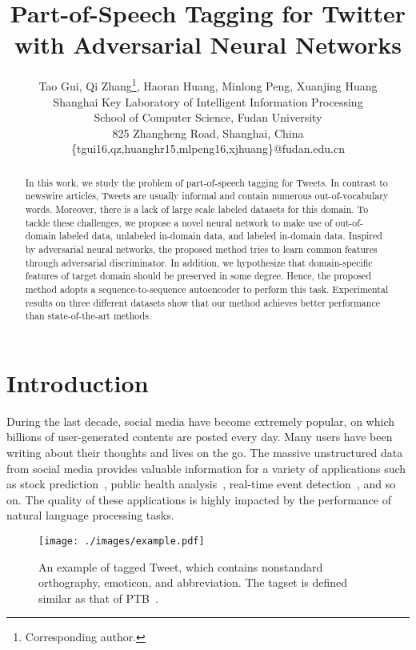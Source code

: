 \documentclass[11pt,letterpaper]{article}
\title{Part-of-Speech Tagging for Twitter with Adversarial Neural Networks}
\author{Tao Gui, Qi Zhang\thanks{{ }{ }Corresponding author.}, Haoran Huang, Minlong Peng, Xuanjing Huang\\
Shanghai Key Laboratory of Intelligent Information Processing\\
School of Computer Science, Fudan University\\
825 Zhangheng Road, Shanghai, China\\
\{tgui16,qz,huanghr15,mlpeng16,xjhuang\}@fudan.edu.cn}
\date{}
\begin{document}
\maketitle

\begin{abstract}
In this work, we study the problem of part-of-speech tagging for Tweets. In contrast to newswire articles, Tweets are usually informal and contain numerous out-of-vocabulary words. Moreover, there is a lack of large scale labeled datasets for this domain. To tackle these challenges, we propose a novel neural network to make use of out-of-domain labeled data, unlabeled in-domain data, and labeled in-domain data.  Inspired by adversarial neural networks, the proposed method tries to learn common features through adversarial discriminator. In addition, we hypothesize that domain-specific features of target domain should be preserved in some degree. Hence, the proposed method adopts a sequence-to-sequence autoencoder to perform this task.  Experimental results on three different datasets  show that our method achieves better performance than state-of-the-art methods.  
\end{abstract}

\section{Introduction}
During the last decade, social media have become extremely popular, on which billions of user-generated contents are posted every day. Many users have been writing about their thoughts and lives on the go.  The massive unstructured data from social media provides valuable information for a variety of applications such as stock prediction~\cite{bollen2011twitter}, public health analysis~\cite{wilson2009early,paul2011you}, real-time event detection~\cite{sakaki2010earthquake}, and so on. The quality of these applications is highly impacted by the performance of natural language processing tasks.%

\begin{figure}[t]
\centering
  \texttt{[image: ./images/example.pdf]}
  \caption{An example of tagged Tweet, which contains nonstandard orthography, emoticon, and abbreviation. The tagset is defined similar as that of PTB~\cite{marcus1993building}.} \label{fig:example}
\end{figure}
\end{document}
